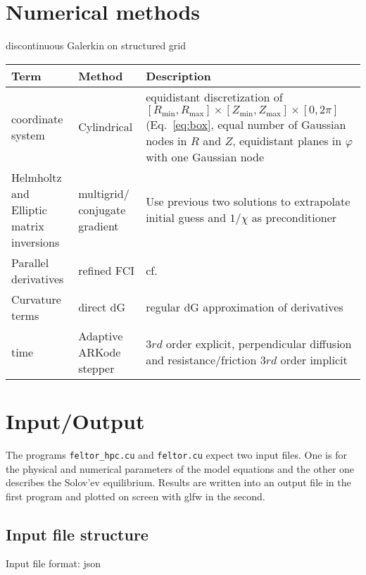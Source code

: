 \section{Numerical methods}
discontinuous Galerkin on structured grid
\begin{longtable}{p{3cm}l>{\RaggedRight}p{7cm}}
\toprule
\rowcolor{gray!50}\textbf{Term} &  \textbf{Method} & \textbf{Description}  \\ \midrule
    coordinate system & Cylindrical & equidistant discretization of $[R_{\min},R_{\max}] \times [Z_{\min},Z_{\max}] \times [0,2\pi]$ (Eq.~\eqref{eq:box}, equal number of Gaussian nodes in $R$ and $Z$, equidistant planes in $\varphi$ with one Gaussian node \\
Helmholtz and Elliptic matrix inversions & multigrid/ conjugate gradient & Use previous two solutions to extrapolate initial guess and $1/\chi$ as preconditioner \\
Parallel derivatives & refined  FCI & cf.~\cite{Held2016,Stegmeir2017} \\
Curvature terms & direct dG & regular dG approximation of derivatives \\
time & Adaptive ARKode stepper & $3rd$ order explicit, perpendicular diffusion and resistance/friction $3rd$ order implicit \\
\bottomrule
\end{longtable}
\section{Input/Output}
The programs \texttt{feltor\_hpc.cu} and \texttt{feltor.cu} expect two input
files. One is for the physical and numerical parameters of the model equations
and the other one describes the Solov'ev equilibrium. Results are written into
an output file in the first program and plotted on screen with glfw in the
second.

\subsection{Input file structure}
Input file format: json

